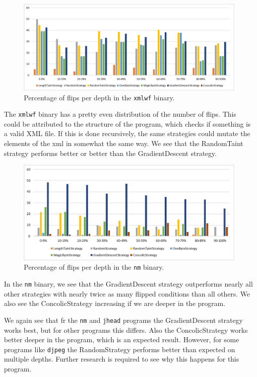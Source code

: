 \begin{figure}[H]
    \centering
    \includegraphics[width=.8\linewidth]{5_results/graphs/xmlwf-depth.png}  
    \caption{Percentage of flips per depth in the \texttt{xmlwf} binary.}
    \label{fig:xmlwfDepth}
\end{figure}
The \texttt{xmlwf} binary has a pretty even distribution of the number of flips. This could be attributed to the structure of the program, which checks if something is a valid XML file. If this is done recursively, the same strategies could mutate the elements of the xml in somewhat the same way. We see that the RandomTaint strategy performs better or better than the GradientDescent strategy.
\begin{figure}[H]
    \centering
    \includegraphics[width=.8\linewidth]{5_results/graphs/nm-depth.png}  
    \caption{Percentage of flips per depth in the \texttt{nm} binary.}
    \label{fig:nmDepth}
\end{figure}
In the \texttt{nm} binary, we see that the GradientDescent strategy outperforms nearly all other strategies with nearly twice as many flipped conditions than all others. We also see the ConcolicStrategy increasing if we are deeper in the program.

We again see that fr the \texttt{nm} and \texttt{jhead} programs the GradientDescent strategy works best, but for other programs this differs. Also the ConcolicStrategy works better deeper in the program, which is an expected result. However, for some programs like \texttt{djpeg} the RandomStrategy performs better than expected on multiple depths. Further research is required to see why this happens for this program.

